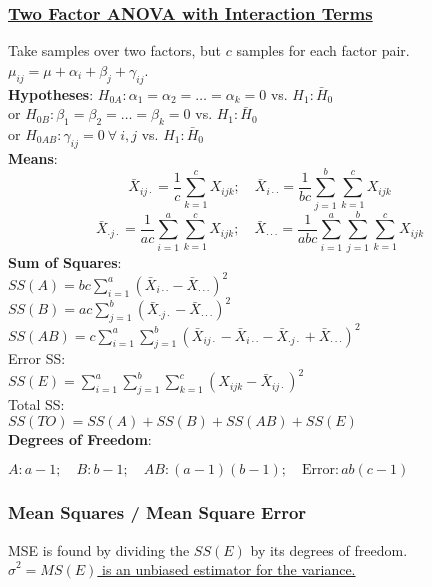 \documentclass{article}
\begin{document}
\begin{multicols*}{2}
\subsubsection*{\underline{Two Factor ANOVA with Interaction Terms}}
Take samples over two factors, but $c$ samples for each factor pair. $\mu_{ij} = \mu + \alpha_{i} + \beta_{j} + \gamma_{ij}$.\\
\textbf{Hypotheses}: $H_{0A}: \alpha_{1} = \alpha_{2} = \dots = \alpha_{k} = 0$ vs. $H_{1}: \bar{H}_{0}$\\
or $H_{0B}: \beta_{1} = \beta_{2} = \dots = \beta_{k} = 0$ vs. $H_{1}: \bar{H}_{0}$\\
or $H_{0AB}: \gamma_{ij} = 0\ \forall\ i, j$ vs. $H_{1}: \bar{H}_{0}$\\
\textbf{Means}:
$$\bar{X}_{i j \cdot} = \frac{1}{c} \sum_{k=1}^{c} X_{ijk}; \quad \bar{X}_{i \cdot \cdot} = \frac{1}{bc} \sum_{j=1}^{b} \sum_{k=1}^{c} X_{ijk}$$
$$ \bar{X}_{\cdot j \cdot} = \frac{1}{ac} \sum_{i=1}^{a} \sum_{k=1}^{c} X_{ijk}; \quad \bar{X}_{\cdot \cdot \cdot} = \frac{1}{abc} \sum_{i=1}^{a} \sum_{j=1}^{b} \sum_{k=1}^{c} X_{ijk}$$
\textbf{Sum of Squares}:\\
$SS(A) = bc \sum_{i=1}^{a} (\bar{X}_{i \cdot \cdot} - \bar{X}_{\cdot \cdot \cdot})^{2}$\\
$SS(B) = ac \sum_{j=1}^{b} (\bar{X}_{\cdot j \cdot} - \bar{X}_{\cdot \cdot \cdot})^{2}$\\
$SS(AB) = c \sum_{i=1}^{a} \sum_{j=1}^{b} (\bar{X}_{i j \cdot} - \bar{X}_{i \cdot \cdot} - \bar{X}_{\cdot j \cdot} + \bar{X}_{\cdot \cdot \cdot})^{2}$\\
Error SS:\\
$SS(E) = \sum_{i=1}^{a} \sum_{j=1}^{b} \sum_{k=1}^{c} (X_{ijk} - \bar{X}_{i j \cdot})^{2}$\\
Total SS:\\
$SS(TO) = SS(A) + SS(B) + SS(AB) + SS(E)$\\
\textbf{Degrees of Freedom}:\\
\centerline{$A: a-1; \quad B: b-1; \quad AB: (a-1)(b-1); \quad \mbox{Error}: ab(c-1)$}

\subsubsection*{Mean Squares / Mean Square Error}
MSE is found by dividing the $SS(E)$ by its degrees of freedom.\\
\underline{$\hat{\sigma}^{2} = MS(E)$ is an unbiased estimator for the variance.}


\end{multicols*}
\end{document}
